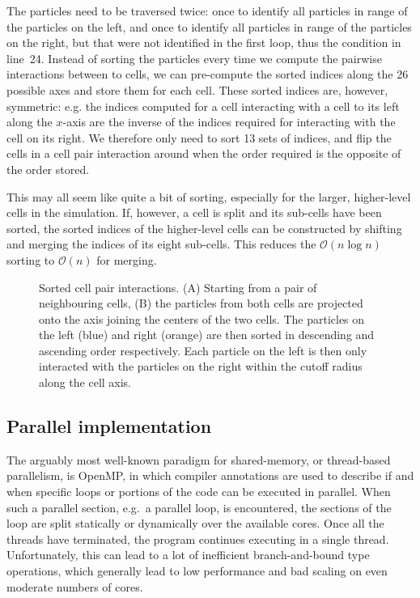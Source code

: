 \documentclass[final]{siamltex}
\newcommand{\oh}[1]
    {\mbox{$ {\mathcal O}( #1 ) $}}
\begin{document}
The particles need to be traversed twice: once to identify
all particles in range of the particles on the left, and
once to identify all particles in range of the particles on the
right, but that were not identified in the first loop,
thus the condition in line~24.
Instead of sorting the particles every time we compute the
pairwise interactions between to cells, we can pre-compute
the sorted indices along the 26 possible axes and store them
for each cell.
These sorted indices are, however, symmetric: e.g. the indices
computed for a cell interacting with a cell to its left along the
$x$-axis are the inverse of the indices required for interacting 
with the cell on its right.
We therefore only need to sort 13 sets of indices, and flip
the cells in a cell pair interaction around when the order
required is the opposite of the order stored.

This may all seem like quite a bit of sorting, especially
for the larger, higher-level cells in the simulation.
If, however, a cell is split and its sub-cells have been sorted,
the sorted indices of the higher-level cells can be constructed
by shifting and merging the indices of its eight sub-cells.
This reduces the \oh{n\log{n}} sorting to \oh{n} for merging. 


\begin{figure}[ht]
    \centerline{}
    
    \caption{Sorted cell pair interactions. ({\sf A}) Starting from a pair of
        neighbouring cells, ({\sf B}) the particles from both cells
        are projected onto the axis joining the centers of the two cells.
        The particles on the left (blue) and right (orange) are
        then sorted in descending and ascending order respectively.
        Each particle on the left is then only interacted with
        the particles on the right within the cutoff radius along the cell axis.
        }
    \label{fig:SortedInteractions}
\end{figure}


\subsection{Parallel implementation}

The arguably most well-known paradigm for shared-memory,
or thread-based parallelism, is OpenMP, in which
compiler annotations are used to describe if and when
specific loops or portions of the code can be executed
in parallel.
When such a parallel section, e.g.~a parallel loop, is
encountered, the sections of the loop are split statically
or dynamically over the available cores.
Once all the threads have terminated, the program continues
executing in a single thread.
Unfortunately, this can lead to a lot of inefficient
branch-and-bound
type operations, which generally lead to low performance and
bad scaling on even moderate numbers of cores.
\end{document}
